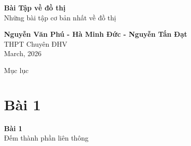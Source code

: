 \documentclass{beamer}
\begin{document}

\begin{frame}[plain]
    \centering
    \vspace{1cm}

    \begin{tcolorbox}[
            enhanced,
            colback=blue!70!black,
            colframe=blue!70!black,
            width=0.75\textwidth,
            arc=4mm,
            boxrule=0pt,
            drop shadow
        ]
        \centering
        {\color{white}\LARGE \textbf{Bài Tập về đồ thị}}\\[0.2cm]
        {\color{white}\large Những bài tập cơ bản nhất về đồ thị}
    \end{tcolorbox}

    \vspace{1.2cm}

    {\Large \textbf{Nguyễn Văn Phú - Hà Minh Đức - Nguyễn Tấn Đạt}}\\[0.4cm]
    THPT Chuyên ĐHV\\[0.6cm]

    March, 2026
\end{frame}

\begin{frame}{Mục lục}
    \tableofcontents
\end{frame}

\section{Bài 1}

\begin{frame}[plain]
    \centering
    \vspace{2cm}

    \begin{tcolorbox}[
            enhanced,
            colback=blue!60,
            colframe=blue!80!black,
            width=0.6\textwidth,
            arc=6mm,
            boxrule=0pt,
            drop shadow
        ]
        \centering
        {\color{white}\Huge \textbf{Bài 1}}\\[0.3cm]
        {\color{white}\Large Đếm thành phần liên thông}
    \end{tcolorbox}

\end{frame}
\end{document}
